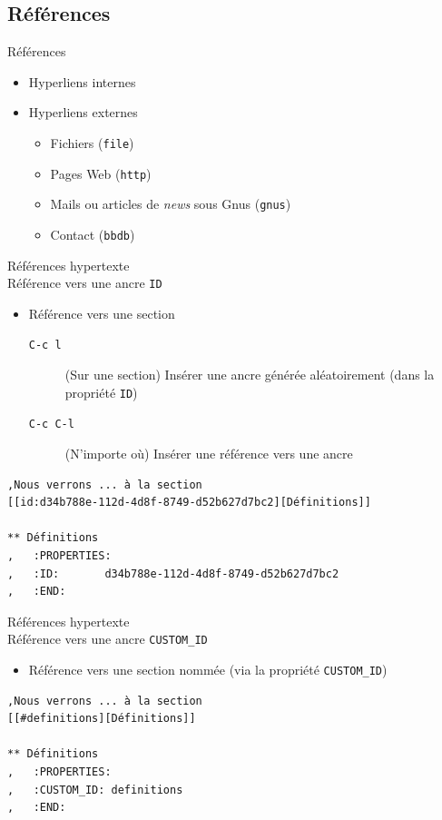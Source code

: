 \documentclass[presentation,t,hideothersubsections]{beamer}
\begin{document}
\subsection{Références}
\label{sec-2-8}

\begin{frame}[fragile,label=sec-2-8-1]{Références}
 \begin{itemize}
\item Hyperliens internes
\item Hyperliens externes
\begin{itemize}
\item Fichiers (\texttt{file})
\item Pages Web (\texttt{http})
\item Mails ou articles de \emph{news} sous Gnus (\texttt{gnus})
\item Contact (\texttt{bbdb})
\end{itemize}
\end{itemize}
\end{frame}
\begin{frame}[fragile,label=sec-2-8-2]{Références hypertexte \\ Référence vers une ancre \texttt{ID}}
 \begin{itemize}
\item Référence vers une section
\begin{description}
\item[\texttt{C-c l}] (Sur une section) Insérer une ancre générée aléatoirement (dans
la propriété \texttt{ID})
\item[\texttt{C-c C-l}] (N'importe où) Insérer une référence vers une ancre
\end{description}
\end{itemize}

\lstset{language=org,numbers=none}
\begin{lstlisting}
,Nous verrons ... à la section
[[id:d34b788e-112d-4d8f-8749-d52b627d7bc2][Définitions]]

** Définitions
,   :PROPERTIES:
,   :ID:       d34b788e-112d-4d8f-8749-d52b627d7bc2
,   :END:
\end{lstlisting}
\end{frame}
\begin{frame}[fragile,label=sec-2-8-3]{Références hypertexte \\ Référence vers une ancre \texttt{CUSTOM\_ID}}
 \begin{itemize}
\item Référence vers une section nommée (via la propriété \texttt{CUSTOM\_ID})
\end{itemize}

\lstset{language=org,numbers=none}
\begin{lstlisting}
,Nous verrons ... à la section
[[#definitions][Définitions]]

** Définitions
,   :PROPERTIES:
,   :CUSTOM_ID: definitions
,   :END:
\end{lstlisting}
\end{frame}
\end{document}
